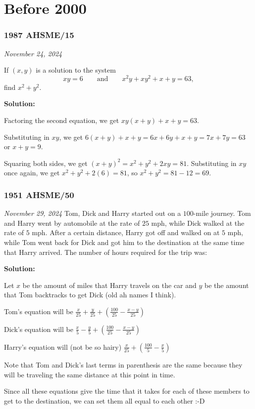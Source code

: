 \documentclass[../mathproblems.tex]{subfiles}
\begin{document}
\noindent\hrulefill
\section{Before 2000}
\subsubsection*{1987 AHSME/15} 
\textit{November 24, 2024}

If $(x, y)$ is a solution to the system
\[ xy=6 \qquad \text{and} \qquad x^2y+xy^2+x+y=63, \]find $x^2+y^2.$

\textbf{Solution:}

Factoring the second equation, we get $xy(x+y)+x+y=63$.

Substituting in $xy$, we get $6(x+y)+x+y = 6x+6y+x+y = 7x+7y = 63$ or $x+y=9$.

Squaring both sides, we get $(x+y)^2 = x^2+y^2+2xy = 81$. Substituting in $xy$ once again, we get $x^2+y^2+2(6)=81$, so $x^2+y^2=81-12=69$.

\noindent\hrulefill
\subsubsection*{1951 AHSME/50} 
\textit{November 29, 2024}
Tom, Dick and Harry started out on a $100$-mile journey. Tom and Harry went by automobile at the rate of $25$ mph, while Dick walked at the rate of $5$ mph. After a certain distance, Harry got off and walked on at $5$ mph, while Tom went back for Dick and got him to the destination at the same time that Harry arrived. The number of hours required for the trip was:

\textbf{Solution:}

Let $x$ be the amount of miles that Harry travels on the car and $y$ be the amount that Tom backtracks to get Dick (old ah names I think).

Tom's equation will be $\frac{x}{25}+\frac{y}{25} + \left(\frac{100}{25}-\frac{x-y}{25}\right)$

Dick's equation will be $\frac{x}{5}-\frac{y}{5} + \left(\frac{100}{25}-\frac{x-y}{25}\right)$

Harry's equation will (not be so hairy) $\frac{x}{25}+\left(\frac{100}{5}-\frac{x}{5}\right)$

Note that Tom and Dick's last terms in parenthesis are the same because they will be traveling the same distance at this point in time.

Since all these equations give the time that it takes for each of these members to get to the destination, we can set them all equal to each other :-D
\end{document}
